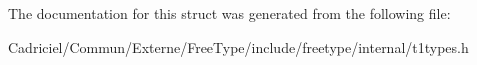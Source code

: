 The documentation for this struct was generated from the following file\+:\begin{DoxyCompactItemize}
\item 
Cadriciel/\+Commun/\+Externe/\+Free\+Type/include/freetype/internal/t1types.\+h\end{DoxyCompactItemize}

